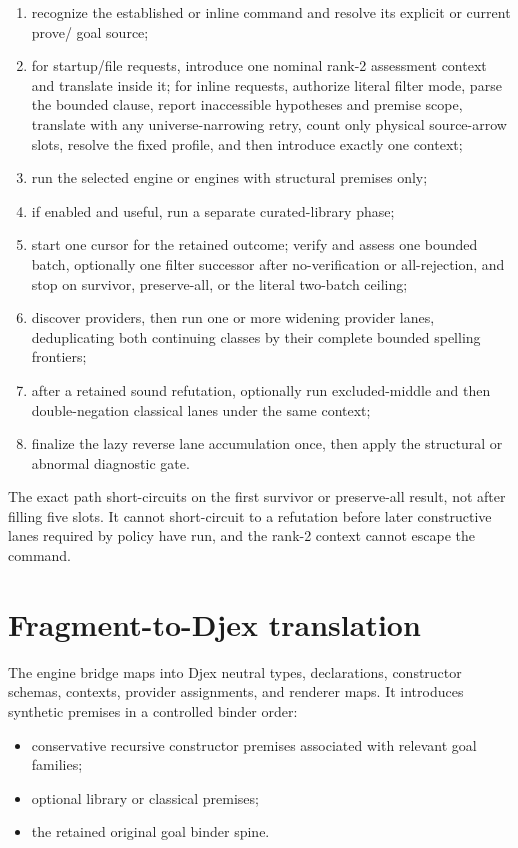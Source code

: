 \documentclass[10pt,letterpaper,oneside]{report}
\newcommand{\code}[1]{\texttt{\detokenize{#1}}}
\begin{document}
\begin{enumerate}
  \item recognize the established or inline command and resolve its explicit or current prove/\code{sorry} goal source;
  \item for startup/file requests, introduce one nominal rank-2 assessment context and translate inside it; for inline requests, authorize literal filter mode, parse the bounded clause, report inaccessible hypotheses and premise scope, translate with any universe-narrowing retry, count only physical source-arrow slots, resolve the fixed profile, and then introduce exactly one context;
  \item run the selected engine or engines with structural premises only;
  \item if enabled and useful, run a separate curated-library phase;
  \item start one cursor for the retained outcome; verify and assess one bounded batch, optionally one filter successor after no-verification or all-rejection, and stop on survivor, preserve-all, or the literal two-batch ceiling;
  \item discover providers, then run one or more widening provider lanes, deduplicating both continuing classes by their complete bounded spelling frontiers;
  \item after a retained sound refutation, optionally run excluded-middle and then double-negation classical lanes under the same context;
  \item finalize the lazy reverse lane accumulation once, then apply the structural or abnormal diagnostic gate.
\end{enumerate}

The exact path short-circuits on the first survivor or preserve-all result, not after filling five slots. It cannot short-circuit to a refutation before later constructive lanes required by policy have run, and the rank-2 context cannot escape the command.

\section{Fragment-to-Djex translation}

The engine bridge maps \code{Frag} into Djex neutral types, declarations, constructor schemas, contexts, provider assignments, and renderer maps. It introduces synthetic premises in a controlled binder order:

\begin{itemize}
  \item conservative recursive constructor premises associated with relevant goal families;
  \item optional library or classical premises;
  \item the retained original goal binder spine.
\end{itemize}
\end{document}
